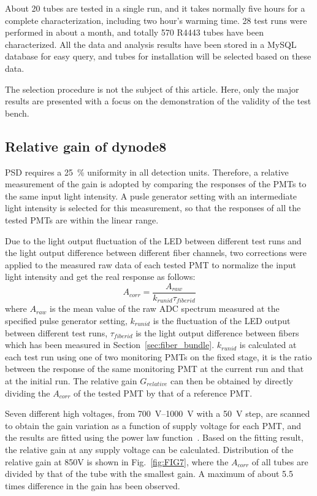 \documentclass{nst}
\begin{document}
About 20 tubes are tested in a single run, and it takes normally five hours for a complete characterization, including two hour's warming time. 
28 test runs were performed in about a month, and totally 570 R4443 tubes have been characterized. 
All the data and analysis results have been stored in a MySQL database for easy query, and tubes for installation will be selected based on these data.

The selection procedure is not the subject of this article.
Here, only the major results are presented with a focus on the demonstration of the validity of the test bench. 

\subsection{Relative gain of dynode8}
\label{sec:psd_gain}

PSD requires a \SI{25}{\percent} uniformity in all detection units. 
Therefore, a relative measurement of the gain is adopted by comparing the responses of the PMTs to the same input light intensity.
A pusle generator setting with an intermediate light intensity is selected for this measurement, so that the responses of all the tested PMTs are within the linear range.


Due to the light output fluctuation of the LED between different test runs and the light output difference between different fiber channels, two corrections were applied to the measured raw data of each tested PMT to normalize the input light intensity and get the real response as follows: 
\begin{equation}
	A_{corr} = \frac{A_{raw}}{k_{runid}\tau_{fiberid}}
\end{equation} 
where $A_{raw}$ is the mean value of the raw ADC spectrum measured at the specified pulse generator setting,
$k_{runid}$ is the fluctuation of the LED output between different test runs,
$\tau_{fiberid}$ is the light output difference between fibers which has been measured in Section~\ref{sec:fiber_bundle}.
$k_{runid}$ is calculated at each test run using one of two monitoring PMTs on the fixed stage, it is the ratio between the response of the same monitoring PMT at the current run and that at the initial run.
The relative gain $G_{relative}$ can then be obtained by directly dividing the $A_{corr}$ of the tested PMT by that of a reference PMT.

Seven different high voltages, from \SIrange{700}{1000}{\volt} with a \SI{50}{\volt} step, are scanned to obtain the gain variation as a function of supply voltage for each PMT, and the results are fitted using the power law function~\cite{hamamatsu}.
Based on the fitting result, the relative gain at any supply voltage can be calculated.
Distribution of the relative gain at 850V is shown in Fig.~\ref{fig:FIG7}, where the $A_{corr}$ of all tubes are divided by that of the tube with the smallest gain. 
A maximum of about 5.5 times difference in the gain has been observed.
\end{document}
